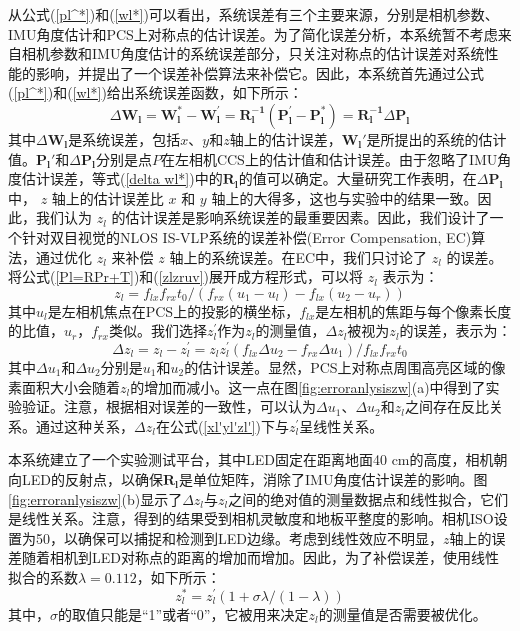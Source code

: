 从公式(\ref{pl^*})和(\ref{wl*})可以看出，系统误差有三个主要来源，分别是相机参数、IMU角度估计和PCS上对称点的估计误差。为了简化误差分析，本系统暂不考虑来自相机参数和IMU角度估计的系统误差部分，只关注对称点的估计误差对系统性能的影响，并提出了一个误差补偿算法来补偿它。因此，本系统首先通过公式(\ref{pl^*})和(\ref{wl*})给出系统误差函数，如下所示：
\begin{equation}\label{delta wl*}
\Delta\mathbf{ W_{l}=W_{l}^{*}-W_{l}^{'}=R_{l}^{-1}(P_{l}^{'}-P_{l}^{*})=R_{l}^{-1}}\Delta \mathbf{P_{l}}
\end{equation}
其中$\Delta\mathbf{ W_{l}}$是系统误差，包括$x$、$y$和$z$轴上的估计误差，$\mathbf{W_{l}{'}}$是所提出的系统的估计值。$\mathbf{P_{l}{'}}$和$\Delta\mathbf{ P_{l}}$分别是点$P$在左相机CCS上的估计值和估计误差。由于忽略了IMU角度估计误差，等式(\ref{delta wl*})中的$\mathbf{R_{l}}$的值可以确定。大量研究工作表明，在$\Delta\mathbf{ P_{l}}$中， $z $ 轴上的估计误差比 $ x $ 和 $ y $ 轴上的大得多，这也与实验中的结果一致。因此，我们认为 $ z_ { l } $ 的估计误差是影响系统误差的最重要因素。因此，我们设计了一个针对双目视觉的NLOS IS-VLP系统的误差补偿(Error Compensation, EC)算法，通过优化 $ z_ { l } $ 来补偿 $ z $ 轴上的系统误差。在EC中，我们只讨论了 $ z_ { l } $ 的误差。将公式(\ref{Pl=RPr+T})和(\ref{zlzruv})展开成方程形式，可以将 $ z_ { l } $ 表示为：   
\begin{equation}\label{xlylzl}
  {z_{l}=f_{lx}f_{rx}t_{0}/(f_{rx}(u_{1}-u_{l})-f_{lx}(u_{2}-u_{r}))}	
\end{equation}
其中$u_{l}$是左相机焦点在PCS上的投影的横坐标，$f_{lx}$是左相机的焦距与每个像素长度的比值，$u_{r}$，$f_{rx}$类似。我们选择$z_{l}^{'}$作为$z_{l}$的测量值，$\Delta z_{l}$被视为$z_{l}$的误差，表示为：
\begin{equation}\label{xl'yl'zl'}
  \Delta z_{l}=z_{l}-z_{l}^{'}= z_{l}z_{l}^{'}(f_{lx}\Delta u_{2}-f_{rx}\Delta u_{1})/ f_{lx}f_{rx}t_{0}
\end{equation}
其中$\Delta u_{1}$和$\Delta u_{2}$分别是$u_{1}$和$u_{2}$的估计误差。显然，PCS上对称点周围高亮区域的像素面积大小会随着$z_{l}$的增加而减小。这一点在图\ref{fig:erroranlysiszw}(a)中得到了实验验证。注意，根据相对误差的一致性，可以认为$\Delta u_{1}$、$\Delta u_{2}$和$z_{l}$之间存在反比关系。通过这种关系，$\Delta z_{l}$在公式(\ref{xl'yl'zl'})下与$z_{l}^{'}$呈线性关系。
 
本系统建立了一个实验测试平台，其中LED固定在距离地面40 cm的高度，相机朝向LED的反射点，以确保$\mathbf{R_{l}}$是单位矩阵，消除了IMU角度估计误差的影响。图\ref{fig:erroranlysiszw}(b)显示了$\Delta z_{l}$与$z_{l}$之间的绝对值的测量数据点和线性拟合，它们是线性关系。注意，得到的结果受到相机灵敏度和地板平整度的影响。相机ISO设置为50，以确保可以捕捉和检测到LED边缘。考虑到线性效应不明显，$z$轴上的误差随着相机到LED对称点的距离的增加而增加。因此，为了补偿误差，使用线性拟合的系数$\lambda=0.112$，如下所示：
 \begin{equation}\label{ECzl}
 {z_{l}^{*}=z_{l}^{'}(1+\sigma \lambda/(1-\lambda ) ) }
\end{equation}
其中，$\sigma$的取值只能是“1”或者“0”，它被用来决定$z_{l}$的测量值是否需要被优化。

